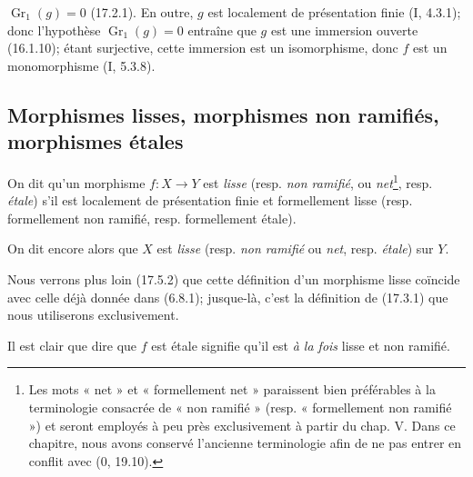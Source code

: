 $\mathop{Gr}\nolimits_1(g)=0$ (17.2.1). En outre, $g$ est localement de présentation finie (I, 4.3.1); donc l'hypothèse $\mathop{Gr}\nolimits_1(g)=0$ entraîne que $g$ est une immersion ouverte (16.1.10); étant surjective, cette immersion est un isomorphisme, donc $f$ est un monomorphisme (I, 5.3.8).

\subsection{Morphismes lisses, morphismes non ramifiés, morphismes étales}

\begin{definition}[17.3.1]
On dit qu'un morphisme $f:X\to Y$ est \emph{lisse} (resp. \emph{non ramifié}, ou \emph{net}\footnote{Les mots « net » et « formellement net » paraissent bien préférables à la terminologie consacrée de « non ramifié » (resp. « formellement non ramifié ») et seront employés à peu près exclusivement à partir du chap. V. Dans ce chapitre, nous avons conservé l'ancienne terminologie afin de ne pas entrer en conflit avec (0, 19.10).}, resp. \emph{étale}) s'il est localement de présentation finie et formellement lisse (resp. formellement non ramifié, resp. formellement étale).
\end{definition}

On dit encore alors que $X$ est \emph{lisse} (resp. \emph{non ramifié} ou \emph{net}, resp. \emph{étale}) sur $Y$.

Nous verrons plus loin (17.5.2) que cette définition d'un morphisme lisse coïncide avec celle déjà donnée dans (6.8.1); jusque-là, c'est la définition de (17.3.1) que nous utiliserons exclusivement.

Il est clair que dire que $f$ est étale signifie qu'il est \emph{à la fois} lisse et non ramifié.

